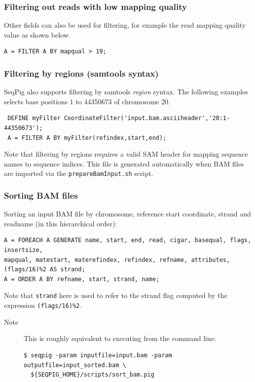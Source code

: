 \subsubsection{Filtering out reads with low mapping quality}

Other fields can also be used for filtering, for example the read
mapping quality value as shown below.
\begin{lstlisting}
A = FILTER A BY mapqual > 19;
\end{lstlisting}

\subsubsection{Filtering by regions (samtools syntax)}

SeqPig also supports filtering by samtools \emph{region} syntax.
The following examples selects base positions 1 to 44350673
of chromosome 20.
\begin{lstlisting}
 DEFINE myFilter CoordinateFilter('input.bam.asciiheader','20:1-44350673');
 A = FILTER A BY myFilter(refindex,start,end);
\end{lstlisting}
Note that filtering by regions requires a valid SAM header for mapping
sequence names to sequence indices. This file is generated automatically
when BAM files are imported via the {\tt prepareBamInput.sh} script.

\subsubsection{Sorting BAM files}
Sorting an input BAM file by chromosome, reference start coordinate, strand
and readname (in this hierarchical order):
\begin{lstlisting}
A = FOREACH A GENERATE name, start, end, read, cigar, basequal, flags, insertsize,
mapqual, matestart, materefindex, refindex, refname, attributes, (flags/16)%2 AS strand;
A = ORDER A BY refname, start, strand, name;
\end{lstlisting}
Note that {\tt strand} here is used to refer to the strand flag computed by the expression
{\tt (flags/16)\%2}.
\begin{description}
	\item[Note] This is roughly equivalent to executing from the command line:
\begin{lstlisting}
$ seqpig -param inputfile=input.bam -param outputfile=input_sorted.bam \
  ${SEQPIG_HOME}/scripts/sort_bam.pig
\end{lstlisting}
\end{description}

